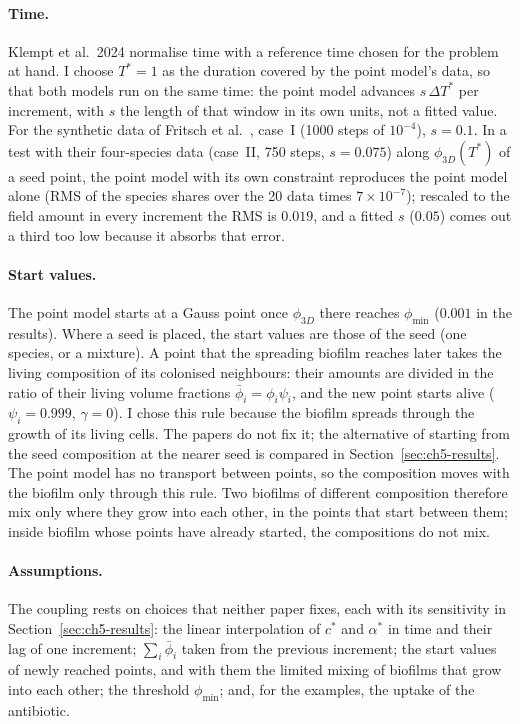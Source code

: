 \paragraph{Time.}
Klempt et al.\ 2024 normalise time with a reference time chosen for the problem at hand. I choose
$T^*=1$ as the duration covered by the point model's data, so that both models run on the same time: the
point model advances $s\,\Delta T^*$ per increment, with $s$ the length of that window in its own units,
not a fitted value. For the synthetic data of Fritsch et al.~\cite{Fritsch2025BayesianMicrofilms},
case~I (1000 steps of $10^{-4}$), $s=0.1$. In a test with their four-species data (case~II, 750
steps, $s=0.075$) along $\phi_{3D}(T^*)$ of a seed point, the point model with its own constraint
reproduces the point model alone (RMS of the species shares over the 20 data times $7\times10^{-7}$);
rescaled to the field amount in every increment the RMS is $0.019$, and a fitted $s$ ($0.05$) comes
out a third too low because it absorbs that error.

\paragraph{Start values.}
The point model starts at a Gauss point once $\phi_{3D}$ there reaches $\phi_{\min}$ ($0.001$ in the results). Where a seed is
placed, the start values are those of the seed (one species, or a mixture). A point that the spreading
biofilm reaches later takes the living composition of its colonised neighbours: their amounts are
divided in the ratio of their living volume fractions $\bar\phi_i=\phi_i\psi_i$, and the new point starts
alive ($\psi_i=0.999$, $\gamma=0$). I chose this rule because the biofilm spreads through the growth of
its living cells. The papers do not fix it; the alternative of starting from the seed composition at the
nearer seed is compared in Section~\ref{sec:ch5-results}. The point model has no transport between
points, so the composition moves with the biofilm only through this rule. Two biofilms of different
composition therefore mix only where they grow into each other, in the points that start between them;
inside biofilm whose points have already started, the compositions do not mix.

\paragraph{Assumptions.} The coupling rests on choices that neither paper fixes, each with its
sensitivity in Section~\ref{sec:ch5-results}: the linear interpolation of $c^*$ and $\alpha^*$ in time
and their lag of one increment; $\sum_i\bar\phi_i$ taken from the previous increment; the start values of newly reached points, and with them the
limited mixing of biofilms that grow into each other; the threshold $\phi_{\min}$; and, for the examples, the uptake of the antibiotic.

